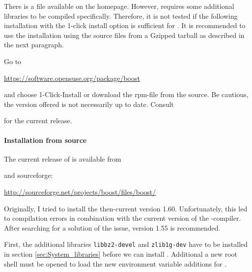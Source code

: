 There is a  file available on the \marktool{\opensusename} homepage. However, \marktool{\boostname} requires some additional libraries to be compiled specifically. Therefore, it is not tested if the following installation with the 1-click install option is sufficient for \marktool{\toolname}. It is recommended to use the installation using the source files from a Gzipped tarball as described in the next paragraph.

Go to

\href{https://software.opensuse.org/package/boost}{https://software.opensuse.org/package/boost}

and choose 1-Click-Install or download the rpm-file from the source. Be cautious, the version offered is not necessarily up to date. Consult

\href{\boostaddress}{\boostaddress}

for the current release.

\paragraph{Installation from source}

The current release of \marktool{\boostname} is available from

\href{\boostaddress}{\boostaddress}

and sourceforge:

\href{http://sourceforge.net/projects/boost/files/boost/}{http://sourceforge.net/projects/boost/files/boost/}

Originally, I tried to install the then-current version 1.60. Unfortunately, this led to compilation errors in combination with the current version of the \marktool{\gccname}-compiler. After searching for a solution of the issue, version 1.55 is recommended.

First, the additional libraries \verb+libbz2-devel+ and \verb+zlib1g-dev+ have to be installed in section \ref{sec:System_libraries} before we can install \marktool{\boostname}. Additional a new root shell must be opened to load the new environment variable additions for \marktool{\openmpiname}.

\begingroup
\lstset{breaklines=true}
\endgroup

